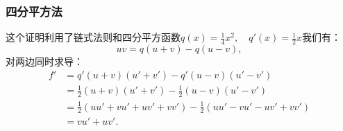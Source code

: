 \subsubsection{四分平方法}
这个证明利用了链式法则和四分平方函数$q(x) = \tfrac{1}{4}x^{2}, \quad q'(x) = \tfrac{1}{2}x$我们有：
$$
uv = q(u+v) - q(u-v),~
$$
对两边同时求导：
$$
\begin{aligned}
f' &= q'(u+v)(u' + v') - q'(u-v)(u' - v') \\[6pt]
&= \tfrac{1}{2}(u+v)(u' + v') - \tfrac{1}{2}(u-v)(u' - v') \\[6pt]
&= \tfrac{1}{2}(uu' + vu' + uv' + vv') - \tfrac{1}{2}(uu' - vu' - uv' + vv') \\[6pt]
&= vu' + uv'.
\end{aligned}~
$$
